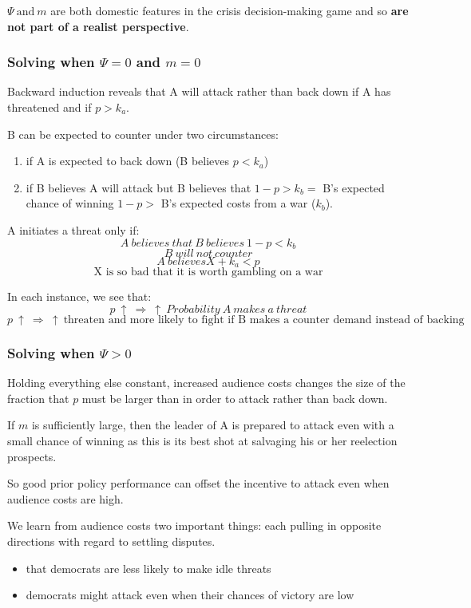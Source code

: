 $\Psi\ \text{and}\ m$ are both domestic features in the crisis decision-making game and so \textbf{are not part of a realist perspective}.

\subsubsection{Solving when $\Psi = 0$ and $m = 0$}
Backward induction reveals that A will attack rather than back down if A has threatened and if $p > k_a$.

B can be expected to counter under two circumstances:
\begin{enumerate}
    \item [(1)] if A is expected to back down (B believes $p < k_a$)
    \item [(2)] if B believes A will attack but B believes that $1 - p > k_b = $ B’s expected chance of winning $1 - p >$ B’s expected costs from a war ($k_b$).
\end{enumerate}

A initiates a threat only if:
\[A\ believes\ that\ B\ believes\ 1 - p < k_b\]
\[B\ will\ not\ counter\]
\[A\ believes X + k_a < p\]
\[\text{X is so bad that it is worth gambling on a war}\]

In each instance, we see that:
\[p\ \uparrow\ \Rightarrow\ \uparrow\ Probability\ A\ makes\ a\ threat\]
\[p\ \uparrow\ \Rightarrow\ \uparrow\ \text{threaten and
more likely to fight if B makes a counter demand instead of backing down}\]

\subsubsection{Solving when $\Psi > 0$}
Holding everything else constant, increased audience costs
changes the size of the fraction that $p$ must be larger than in order to attack rather than back
down.

If $m$ is sufficiently large, then the leader of A is prepared to attack even with a small chance of winning as this is its best shot at salvaging his or her reelection prospects.

So good prior policy performance can offset the incentive to attack even when audience costs are high.

We learn from audience costs two important things: each pulling in opposite directions with regard to settling disputes.

\begin{itemize}
    \item that democrats are less likely to make idle threats
    \item democrats might attack even when their chances of victory are low
\end{itemize}

